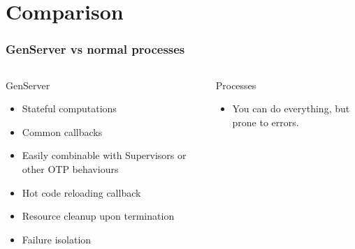 \section{Comparison}
\frame{\tableofcontents[currentsection]}

\begin{frame}
    \frametitle{GenServer vs normal processes}
    \begin{columns}
        \begin{column}[T]{0.5\textwidth}
            GenServer
            \vfill
            \begin{itemize}
                \small
                \item Stateful computations
                \item Common callbacks
                \item Easily combinable with Supervisors or other OTP behaviours
                \item Hot code reloading callback
                \item Resource cleanup upon termination
                \item Failure isolation
            \end{itemize}
        \end{column}
        \begin{column}[T]{0.5\textwidth}
            Processes
            \begin{itemize}
                \item You can do everything, but prone to errors.
            \end{itemize}
        \end{column}
    \end{columns}
\end{frame}

